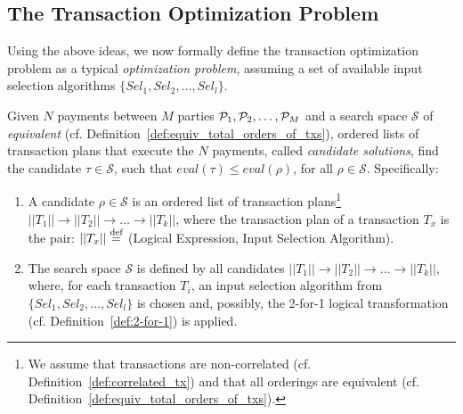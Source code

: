 \subsection{The Transaction Optimization Problem}\label{sec:tx-opt-problem}

Using the above ideas, we now formally define the transaction optimization
problem as a typical \emph{optimization problem}, assuming a set of available
input selection algorithms $\{Sel_1, Sel_2, \dots, Sel_l\}$.

\begin{definition}\label{def:tx-optimization-problem}
    Given $N$ payments between $M$ parties $\mathcal{P}_1, \mathcal{P}_2, \dots, \mathcal{P}_M$ and a
    search space $\mathcal{S}$ of \emph{equivalent} (cf.
    Definition~\ref{def:equiv_total_orders_of_txs}), ordered lists of
    transaction plans that execute the $N$ payments, called \emph{candidate
    solutions}, find the candidate $\tau \in \mathcal{S}$, such that
    $eval(\tau) \leq eval(\rho)$, for all $\rho \in \mathcal{S}$.
    Specifically:
    \begin{enumerate}
        \item A candidate $\rho \in \mathcal{S}$ is an ordered list of
            transaction plans\footnote{We assume that transactions are
            non-correlated (cf. Definition~\ref{def:correlated_tx}) and that all
            orderings are equivalent (cf.
            Definition~\ref{def:equiv_total_orders_of_txs}).} $||T_1||
            \rightarrow
            ||T_2|| \rightarrow \dots \rightarrow ||T_k||$, where the
            transaction plan of
            a transaction $T_x$ is the pair:
            $||T_x|| \stackrel{\textrm{\scriptsize def}}{=}$ (Logical Expression, Input Selection Algorithm).

        \item The search space $\mathcal{S}$ is defined by all candidates
        $||T_1||
            \rightarrow ||T_2|| \rightarrow \dots \rightarrow ||T_k||$, where,
            for each
            transaction $T_i$, an input selection algorithm from
            $\{Sel_1, Sel_2, \dots, Sel_l\}$ is chosen and, possibly, the 2-for-1 logical
            transformation (cf.  Definition~\ref{def:2-for-1}) is applied.


\end{enumerate}
\end{definition}
